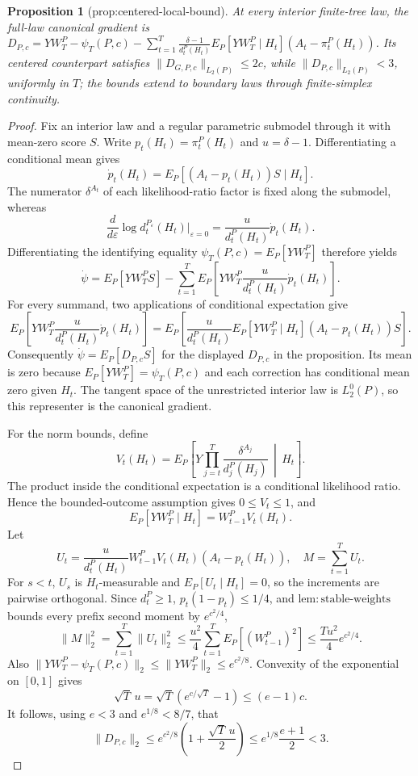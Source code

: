\documentclass{article}
\newtheorem{proposition}{Proposition}
\begin{document}
\begin{proposition}[prop:centered-local-bound]\label{prop:centered-local-bound}
At every interior finite-tree law, the full-law canonical gradient is \(D_{P,c}=YW_T^P-\psi_T(P,c)-\sum_{t=1}^T\frac{\delta-1}{d_t^P(H_t)}E_P[YW_T^P\mid H_t](A_t-\pi_t^P(H_t))\). Its centered counterpart satisfies \(\lVert D_{G,P,c}\rVert_{L_2(P)}\leq2c\), while \(\lVert D_{P,c}\rVert_{L_2(P)}<3\), uniformly in \(T\); the bounds extend to boundary laws through finite-simplex continuity.
\end{proposition}
\begin{proof}
Fix an interior law and a regular parametric submodel through it with mean-zero score \(S\).  Write \(p_t(H_t)=\pi_t^P(H_t)\) and \(u=\delta-1\).  Differentiating a conditional mean gives
\[
 \dot p_t(H_t)=E_P[(A_t-p_t(H_t))S\mid H_t].
\]
The numerator \(\delta^{A_t}\) of each likelihood-ratio factor is fixed along the submodel, whereas
\[
 \frac{d}{d\varepsilon}\log d_t^{P_\varepsilon}(H_t)\bigg|_{\varepsilon=0}
 =\frac{u}{d_t^P(H_t)}\dot p_t(H_t).
\]
Differentiating the identifying equality \(\psi_T(P,c)=E_P[YW_T^P]\) therefore yields
\[
 \dot\psi
 =E_P[YW_T^P S]
 -\sum_{t=1}^T E_P\left[YW_T^P\frac{u}{d_t^P(H_t)}\dot p_t(H_t)\right].
\]
For every summand, two applications of conditional expectation give
\[
 E_P\left[YW_T^P\frac{u}{d_t^P(H_t)}\dot p_t(H_t)\right]
 =E_P\left[\frac{u}{d_t^P(H_t)}E_P[YW_T^P\mid H_t]
              (A_t-p_t(H_t))S\right].
\]
Consequently \(\dot\psi=E_P[D_{P,c}S]\) for the displayed \(D_{P,c}\) in the proposition.  Its mean is zero because \(E_P[YW_T^P]=\psi_T(P,c)\) and each correction has conditional mean zero given \(H_t\).  The tangent space of the unrestricted interior law is \(L_2^0(P)\), so this representer is the canonical gradient.

For the norm bounds, define
\[
 V_t(H_t)=E_P\left[Y\prod_{j=t}^T\frac{\delta^{A_j}}{d_j^P(H_j)}\,\middle|\,H_t\right].
\]
The product inside the conditional expectation is a conditional likelihood ratio.  Hence the bounded-outcome assumption gives \(0\leq V_t\leq1\), and
\[
 E_P[YW_T^P\mid H_t]=W_{t-1}^P V_t(H_t).
\]
Let
\[
 U_t=\frac{u}{d_t^P(H_t)}W_{t-1}^PV_t(H_t)(A_t-p_t(H_t)),
 \quad M=\sum_{t=1}^TU_t.
\]
For \(s<t\), \(U_s\) is \(H_t\)-measurable and \(E_P[U_t\mid H_t]=0\), so the increments are pairwise orthogonal.  Since \(d_t^P\geq1\), \(p_t(1-p_t)\leq1/4\), and \(\mathrm{lem:stable\text{-}weights}\) bounds every prefix second moment by \(e^{c^2/4}\),
\[
 \|M\|_2^2
 =\sum_{t=1}^T\|U_t\|_2^2
 \leq\frac{u^2}{4}\sum_{t=1}^TE_P[(W_{t-1}^P)^2]
 \leq\frac{Tu^2}{4}e^{c^2/4}.
\]
Also \(\|YW_T^P-\psi_T(P,c)\|_2\leq\|YW_T^P\|_2\leq e^{c^2/8}\).  Convexity of the exponential on \([0,1]\) gives
\[
 \sqrt T\,u=\sqrt T(e^{c/\sqrt T}-1)\leq(e-1)c.
\]
It follows, using \(e<3\) and \(e^{1/8}<8/7\), that
\[
 \|D_{P,c}\|_2
 \leq e^{c^2/8}\left(1+\frac{\sqrt T\,u}{2}\right)
 \leq e^{1/8}\frac{e+1}{2}<3.
\]


\end{proof}
\end{document}
